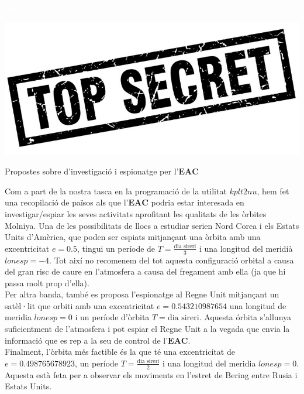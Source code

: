 \documentclass[12pt]{article}
\begin{document}
\newpage
\textcolor{white}{hola}
\newpage
\begin{titlepage}
\centering
{\includegraphics[width=1\textwidth]{topsecret.PNG}\par}
\vspace{5cm}
{\Huge Propostes sobre d'investigació i espionatge per l'$\mathbf{EAC}$\par}
\end{titlepage}
Com a part de la nostra tasca en la programació de la utilitat $kplt2nu$, hem fet una recopilació de països als que l'$\mathbf{EAC}$ podria estar interesada en investigar/espiar les seves activitats aprofitant les qualitats de les òrbites Molniya.
\newline
Una de les possibilitats de llocs a estudiar serien Nord Corea i els Estats Units d'Amèrica, que poden ser espiats mitjançant una òrbita amb una excentricitat $e=0.5$, tingui un període de $T=\frac{\text{dia sireri}}{3}$ i una longitud del meridià $lonesp=-4$. Tot així no recomenem del tot aquesta configuració orbital a causa del gran risc de caure en l'atmosfera a causa del fregament amb ella (ja que hi passa molt prop d'ella).\\
Per altra banda, també es proposa l'espionatge al Regne Unit mitjançant un satèl·lit que orbiti amb una excentricitat $e=0.543210987654$ una longitud de meridia $lonesp=0$ i un període d'òrbita $T=\text{dia sireri}$. Aquesta órbita s'allunya suficientment de l'atmosfera i pot espiar el Regne Unit a la vegada que envia la informació que es rep a la seu de control de l'$\mathbf{EAC}$.\\
Finalment, l'òrbita més factible és la que té una excentricitat de $e=0.498765678923$, un període $T=\frac{\text{dia sireri}}{2}$ i una longitud del meridia $lonesp=0$. Aquesta està feta per a observar els moviments en l'estret de Bering entre Rusia i Estats Units.
\newpage
\end{document}
